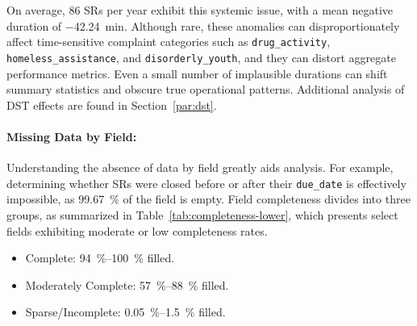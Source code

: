 \documentclass[linenumber]{jdsart}
\begin{document}
On average, \num{86} SRs per year exhibit this systemic issue,
with a mean negative duration of \SI[round-precision=2]{-42.24}{\minute}. 
Although rare, these anomalies can disproportionately affect 
time-sensitive complaint categories such as
\texttt{drug\_activity}, \texttt{homeless\_assistance}, and
\texttt{disorderly\_youth}, and they can distort aggregate performance metrics.
Even a small number of implausible durations can shift summary statistics and
obscure true operational patterns. Additional analysis of 
DST effects are found in Section~\ref{par:dst}.



\paragraph{Missing Data by Field:}
\label{sec:blanks}
Understanding the absence of data by field greatly aids analysis. 
For example, determining whether SRs were closed
before or after their \texttt{due\_date} is effectively impossible,
as \SI[round-mode=places, round-precision=2]{99.67}{\percent}
of the field is empty. Field completeness divides
into three groups, as summarized in 
Table~\ref{tab:completeness-lower}, which presents select fields
exhibiting moderate or low completeness rates.


\begin{itemize}[left=1.5em, itemsep=0.25\baselineskip]
    \item Complete: \SIrange{94}{100}{\percent} filled.
    \item Moderately Complete: \SIrange{57}{88}{\percent} filled.
    \item Sparse/Incomplete: \SIrange{0.05}{1.5}{\percent} filled.
\end{itemize}
\end{document}
